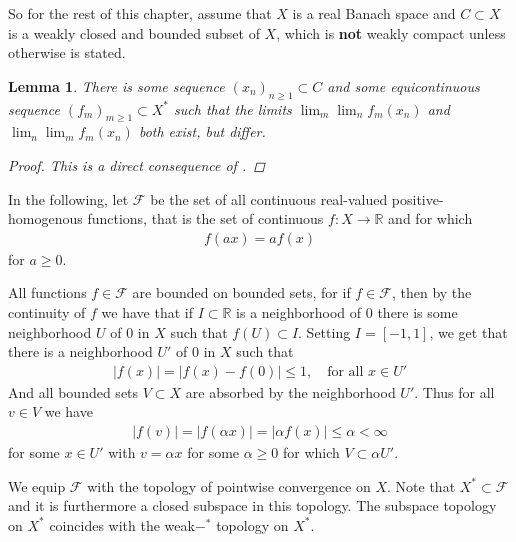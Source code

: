 \documentclass[10pt,twoside,openany,final]{memoir}
\theoremstyle{break}
\newtheorem{lemma}[section]{Lemma}
\theoremstyle{Break}
\newcommand{\R}{\mathbb{R}}
\begin{document}
\noindent So for the rest of this chapter, assume that $X$ is a real Banach space and $C \subset X$ is a weakly closed and bounded subset of $X$, which is \textbf{not} weakly compact unless otherwise is stated.
\begin{lemma}\label{pryce 1}
There is some sequence $(x_{n})_{n\geq1} \subset C$ and some equicontinuous sequence $(f_{m})_{m\geq 1} \subset X^*$ such that the limits $\lim_{m} \lim_{n} f_{m} (x_{n})$ and $\lim_{n} \lim_{m} f_{m} (x_{n})$ both exist, but differ.
\begin{proof}
This is a direct consequence of .
\end{proof}
\end{lemma}
\noindent In the following, let $\mathcal{F}$ be the set of all continuous real-valued positive-homogenous functions, that is the set of continuous $f\colon X\to \R$ and for which 
\begin{align*}
f(ax)=af(x)
\end{align*}
for $a\geq 0$.

All functions $f \in \mathcal{F}$ are bounded on bounded sets, for if $f \in \mathcal{F}$, then by the continuity of $f$ we have that if $I\subset \R$ is a neighborhood of $0$ there is some neighborhood $U$ of $0$ in $X$ such that $f(U) \subset I$. Setting $I=[-1,1]$, we get that there is a neighborhood $U'$ of $0$ in $X$ such that 
\begin{align*}
|f(x)|=|f(x)-f(0)|\leq 1, \quad \text{for all } x \in U'
\end{align*}
And all bounded sets $V \subset X$ are absorbed by the neighborhood $U'$. Thus for all $v \in V$ we have 
\begin{align*}
|f(v)|=|f(\alpha x)|=|\alpha  f(x)| \leq \alpha < \infty
\end{align*}
for some $x \in U'$ with $v=\alpha x$ for some $\alpha \geq 0$ for which $V \subset \alpha U'$.

We equip $\mathcal{F}$ with the topology of pointwise convergence on $X$.
Note that $X^* \subset \mathcal{F}$ and it is furthermore a closed subspace in this topology.
The subspace topology on  $X^*$ coincides with the weak$-^*$ topology on $X^*$. 
\end{document}
